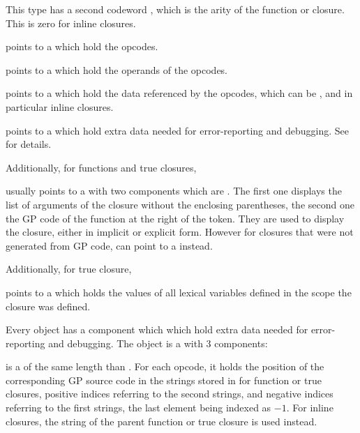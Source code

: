 This type has a second codeword , which is the arity of the
function or closure. This is zero for inline closures.

\item {} points to a  which hold the opcodes.

\item {} points to a  which hold the operands of the opcodes.

\item {} points to a  which hold the data referenced by the
 opcodes, which can be , and in particular
inline closures.

\item {} points to a  which hold extra data needed for
error-reporting and debugging. See  for details.

Additionally, for functions and true closures,

\item {} usually points to a  with two components which are .
The first one displays the list of arguments of the closure without the
enclosing parentheses, the second one the GP code of the function at the
right of the \kbd{->} token. They are used to display the closure, either in
implicit or explicit form. However for closures that were not generated from GP
code,  can point to a  instead.

Additionally, for true closure,

\item {} points to a  which holds the values of all lexical
variables defined in the scope the closure was defined.

\label{se:dbgclosure}

Every  object  has a component 
which which hold extra data needed for error-reporting and debugging.
The object  is a  with $3$ components:

 is a  of the same length than . For each
opcode, it holds the position of the corresponding GP source code in the
strings stored in  for function or true closures, positive indices
referring to the second strings, and negative indices referring to the first
strings, the last element being indexed as $-1$. For inline closures, the
string of the parent function or true closure is used instead.

